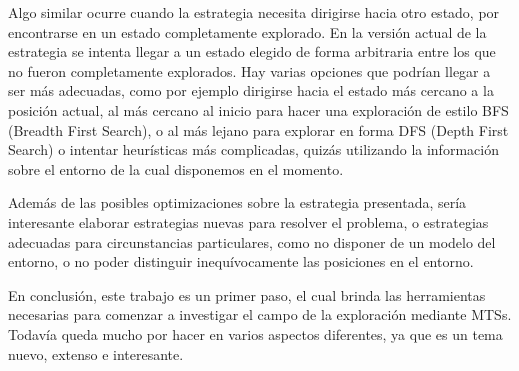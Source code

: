 \vspace{\baselineskip}
Algo similar ocurre cuando la estrategia necesita dirigirse hacia otro estado, por encontrarse en un estado completamente explorado. 
En la versión actual de la estrategia se intenta llegar a un estado elegido de forma arbitraria entre los que no fueron completamente 
explorados. Hay varias opciones que podrían llegar a ser más adecuadas, como por ejemplo dirigirse hacia el estado más cercano a la 
posición actual, al más cercano al inicio para hacer una exploración de estilo BFS (Breadth First Search), o al más lejano para explorar 
en forma DFS (Depth First Search) o intentar heurísticas más complicadas, quizás utilizando la información sobre el entorno de la cual 
disponemos en el momento.

\vspace{\baselineskip}
Además de las posibles optimizaciones sobre la estrategia presentada, sería interesante elaborar estrategias nuevas para resolver el 
problema, o estrategias adecuadas para circunstancias particulares, como no disponer de un modelo del entorno, o no poder distinguir 
inequívocamente las posiciones en el entorno.

\vspace{\baselineskip}
En conclusión, este trabajo es un primer paso, el cual brinda las herramientas necesarias para comenzar a investigar el campo de la 
exploración mediante MTSs. Todavía queda mucho por hacer en varios aspectos diferentes, ya que es un tema nuevo, extenso e interesante.